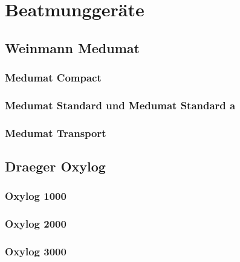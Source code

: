 \section{Beatmunggeräte}

\subsection{Weinmann Medumat}

\subsubsection{Medumat Compact}

\subsubsection{Medumat Standard und Medumat Standard a}

\subsubsection{Medumat Transport}

\subsection{Draeger Oxylog}

\subsubsection{Oxylog 1000}

\subsubsection{Oxylog 2000}

\subsubsection{Oxylog 3000}